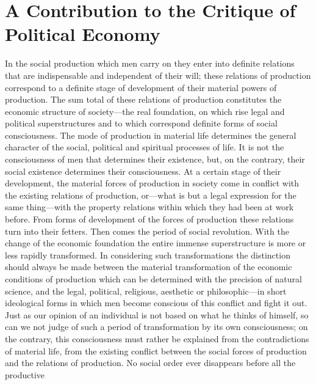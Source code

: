 
\author{Karl Marx}
\chapter[A Contribution to the Critique of Political Economy,\\
Preface, excerpt]{A Contribution to the Critique of Political Economy}


In the social production which men carry on they enter into
definite relations that are indispensable and independent of their
will; these relations of production correspond to a definite stage of
development of their material powers of production. The sum total of
these relations of production constitutes the economic structure of
society---the real foundation, on which rise legal and political
superstructures and to which correspond definite forms of social
consciousness. The mode of production in material life determines the
general character of the social, political and spiritual processes of
life. It is not the consciousness of men that determines their
existence, but, on the contrary, their social existence determines
 their consciousness. At a certain stage of their
development, the material forces of production in society come in
conflict with the existing relations of production, or---what is but a
legal expression for the same thing---with the property relations
within which they had been at work before. From forms of development
of the forces of production these relations turn into their fetters.
Then comes the period of social revolution. With the change of the
economic foundation the entire immense superstructure is more or less
rapidly transformed. In considering such transformations the
distinction should always be made between the material transformation
of the economic conditions of production which can be determined with
the precision of natural science, and the legal, political, religious,
aesthetic or philosophic---in short ideological forms in which men
become conscious of this conflict and fight it out. Just as our
opinion of an individual is not based on what he thinks of himself, so
can we not judge of such a period of transformation by its own
consciousness; on the contrary, this consciousness must rather be
explained from the contradictions of material life, from the existing
conflict between the social forces of production and the relations of
production. No social order ever disappears before all the productive

